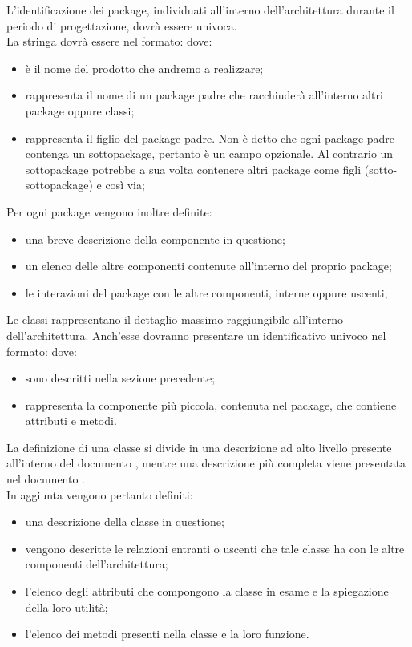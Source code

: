 \documentclass[a4paper, titlepage]{article}
\begin{document}
L'identificazione dei package, individuati all'interno dell'architettura durante il periodo di progettazione, dovrà essere univoca.
\\ La stringa dovrà essere nel formato:
dove:
\begin{itemize}
\item {} è il nome del prodotto che andremo a realizzare;
\item {} rappresenta il nome di un package padre che racchiuderà all'interno altri package oppure classi;
\item {} rappresenta il figlio del package padre. Non è detto che ogni package padre contenga un sottopackage, pertanto è un campo opzionale. Al contrario un sottopackage potrebbe a sua volta contenere altri package come figli (sotto-sottopackage) e così via;
\end{itemize} 
Per ogni package vengono inoltre definite:
\begin{itemize}
\item una breve descrizione della componente in questione;
\item {} un elenco delle altre componenti contenute all'interno del proprio package;
\item {} le interazioni del package con le altre componenti, interne oppure uscenti;
\end{itemize}

Le classi rappresentano il dettaglio massimo raggiungibile all'interno dell'architettura. 
\newline Anch'esse dovranno presentare un identificativo univoco nel formato:
dove:
\begin{itemize}
\item {} sono descritti nella sezione precedente;
\item {} rappresenta la componente più piccola, contenuta nel package, che contiene attributi e metodi.
\end{itemize}

La definizione di una classe si divide in una descrizione ad alto livello presente all'interno del documento , mentre una descrizione più completa viene presentata nel documento .
\\ In aggiunta vengono pertanto definiti:
\begin{itemize}
\item una descrizione della classe in questione;
\item {} vengono descritte le relazioni entranti o uscenti che tale classe ha con le altre componenti dell'architettura;
\item {} l'elenco degli attributi che compongono la classe in esame e la spiegazione della loro utilità;
\item {} l'elenco dei metodi presenti nella classe e la loro funzione.
\end{itemize}
\end{document}
